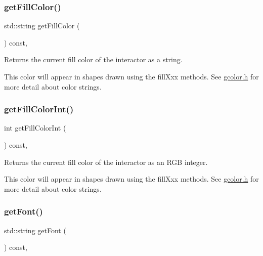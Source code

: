 \subsubsection{\texorpdfstring{get\+Fill\+Color()}{getFillColor()}}
{\footnotesize\ttfamily std\+::string get\+Fill\+Color (\begin{DoxyParamCaption}{ }\end{DoxyParamCaption}) const\hspace{0.3cm}{\ttfamily [virtual]}, {\ttfamily [inherited]}}



Returns the current fill color of the interactor as a string. 

This color will appear in shapes drawn using the fill\+Xxx methods. See \mbox{\hyperlink{gcolor_8h_source}{gcolor.\+h}} for more detail about color strings. \mbox{\label{classGDrawingSurface_a88f4508d9271c4b5f5b5d6b780f223d0}} 
\subsubsection{\texorpdfstring{get\+Fill\+Color\+Int()}{getFillColorInt()}}
{\footnotesize\ttfamily int get\+Fill\+Color\+Int (\begin{DoxyParamCaption}{ }\end{DoxyParamCaption}) const\hspace{0.3cm}{\ttfamily [virtual]}, {\ttfamily [inherited]}}



Returns the current fill color of the interactor as an R\+GB integer. 

This color will appear in shapes drawn using the fill\+Xxx methods. See \mbox{\hyperlink{gcolor_8h_source}{gcolor.\+h}} for more detail about color strings. \mbox{\label{classGDrawingSurface_a894a5502900794eeb27d084c21f1d77d}} 
\subsubsection{\texorpdfstring{get\+Font()}{getFont()}}
{\footnotesize\ttfamily std\+::string get\+Font (\begin{DoxyParamCaption}{ }\end{DoxyParamCaption}) const\hspace{0.3cm}{\ttfamily [virtual]}, {\ttfamily [inherited]}}



